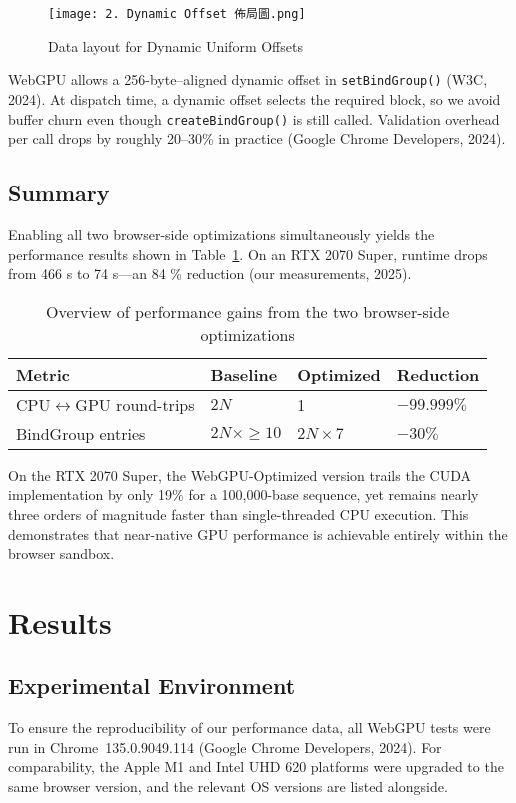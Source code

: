\documentclass[PhD]{PHlab-thesis}
\begin{document}
\begin{figure}[htbp]
    \centering
    \texttt{[image: 2. Dynamic Offset 佈局圖.png]}
    \caption{Data layout for Dynamic Uniform Offsets}
    \label{fig:dynamic-offset-layout}
\end{figure}

WebGPU allows a 256-byte–aligned dynamic offset in \texttt{setBindGroup()} (W3C, 2024). At dispatch time, a dynamic offset selects the required block, so we avoid buffer churn even though \texttt{createBindGroup()} is still called. Validation overhead per call drops by roughly 20–30\% in practice (Google Chrome Developers, 2024).

\section{Summary}
Enabling all two browser-side optimizations simultaneously yields the performance results shown in Table~\ref{tab:opt_performance}. On an RTX 2070 Super, runtime drops from 466 s to 74 s—an 84 \% reduction (our measurements, 2025).
\begin{table}[h]
    \centering
    \setlength{\tabcolsep}{6pt}
    \renewcommand{\arraystretch}{1.4}
    \small
    \begin{tabularx}{\textwidth}{|X|X|X|X|}
        \hline
        Metric & Baseline & Optimized & Reduction \\
        \hline
        CPU$\leftrightarrow$GPU round-trips & $2N$ & 1 & $-99.999\%$ \\
        BindGroup entries & $2N \times \geq 10$ & $2N \times 7$ & $-30\%$ \\
        \hline
    \end{tabularx}
    \caption{Overview of performance gains from the two browser-side optimizations}
    \label{tab:opt_performance}
\end{table}
On the RTX 2070 Super, the WebGPU-Optimized version trails the CUDA implementation by only 19\% for a 100,000-base sequence, yet remains nearly three orders of magnitude faster than single-threaded CPU execution. This demonstrates that near-native GPU performance is achievable entirely within the browser sandbox.



	
\chapter{Results}
\section{Experimental Environment}
To ensure the reproducibility of our performance data, all WebGPU tests were run in Chrome~135.0.9049.114 (Google Chrome Developers, 2024). For comparability, the Apple M1 and Intel UHD 620 platforms were upgraded to the same browser version, and the relevant OS versions are listed alongside.
\end{document}
